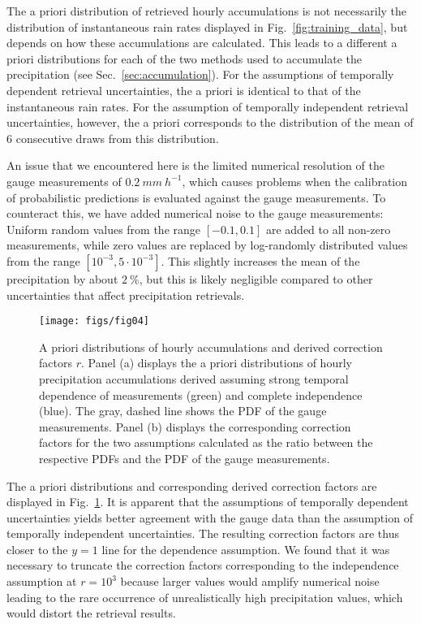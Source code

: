 \documentclass[journal abbreviation, manuscript]{copernicus}
\begin{document}
The a priori distribution of retrieved hourly accumulations is not necessarily
the distribution of instantaneous rain rates displayed in
Fig.~\ref{fig:training_data}, but depends on how these accumulations are
calculated. This leads to a different a priori distributions for each of the two
methods used to accumulate the precipitation (see Sec.~\ref{sec:accumulation}).
For the assumptions of temporally dependent retrieval uncertainties, the a
priori is identical to that of the instantaneous rain rates. For the assumption
of temporally independent retrieval uncertainties, however, the a priori
corresponds to the distribution of the mean of 6 consecutive draws from this
distribution.

An issue that we encountered here is the limited numerical resolution of the
gauge measurements of $0.2\ \unit{mm\ h^{-1}}$, which causes problems when the
calibration of probabilistic predictions is evaluated against the gauge
measurements. To counteract this, we have added numerical noise to the gauge
measurements: Uniform random values from the range $[-0.1 , 0.1]$ are added to
all non-zero measurements, while zero values are replaced by log-randomly
distributed values from the range $[10^{-3}, 5 \cdot 10^{-3}]$. This slightly
increases the mean of the precipitation by about $2\ \unit{\%}$, but this is
likely negligible compared to other uncertainties that affect precipitation
retrievals.

\begin{figure}[hbpt!]
  \centering
  \texttt{[image: figs/fig04]}
  \caption{
    A priori distributions of hourly accumulations and derived correction
    factors $r$. Panel (a) displays the a priori distributions of hourly
    precipitation accumulations derived assuming strong temporal dependence of
    measurements (green) and complete independence (blue). The gray, dashed line
    shows the PDF of the gauge measurements. Panel (b) displays the
    corresponding correction factors for the two assumptions calculated as the
    ratio between the respective PDFs and the PDF of the gauge measurements.
  }
  \label{fig:correction_factors}
\end{figure}

The a priori distributions and corresponding derived correction factors are
displayed in Fig.~\ref{fig:correction_factors}. It is apparent that the
assumptions of temporally dependent uncertainties yields better agreement with
the gauge data than the assumption of temporally independent uncertainties. The
resulting correction factors are thus closer to the $y=1$ line for the
dependence assumption. We found that it was necessary to truncate the correction
factors corresponding to the independence assumption at $r=10^3$ because larger
values would amplify numerical noise leading to the rare occurrence of
unrealistically high precipitation values, which would distort the retrieval
results.
\end{document}
